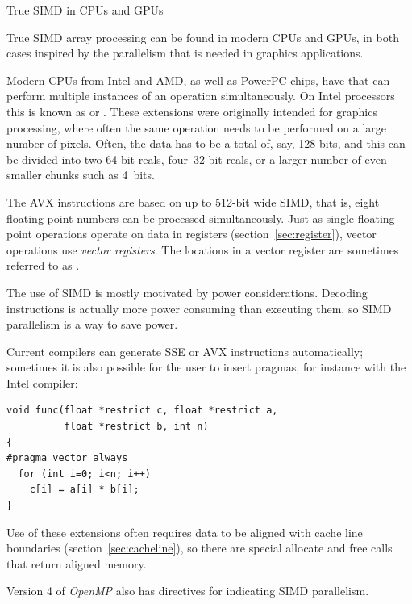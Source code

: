  {True SIMD in CPUs and GPUs}
\label{sec:sse-avx}

True SIMD array processing can be found in modern CPUs and GPUs, in
both cases inspired by the parallelism that is needed in graphics
applications.

Modern CPUs from Intel and AMD, as well as
PowerPC chips, have  that can perform
multiple instances of an operation simultaneously. On Intel processors
this is known as  or . These extensions were
originally intended for graphics processing, where often the same
operation needs to be performed on a large number of pixels. Often,
the data has to be a total of, say, 128 bits, and this can be divided
into two 64-bit reals, four~32-bit reals, or a larger number of even
smaller chunks such as 4~bits. 

The \ac{AVX} instructions are based on up to
512-bit wide SIMD, that is, eight floating point numbers can be
processed simultaneously. Just as single floating point operations
operate on data in registers (section~\ref{sec:register}),
vector operations use \emph{vector registers}.
The locations in a vector register are sometimes referred to as .

The use of SIMD is mostly
motivated by power considerations. Decoding instructions is actually
more power consuming than executing them, so SIMD parallelism is a way
to save power.

Current compilers can generate \ac{SSE} or \ac{AVX}
instructions automatically;
sometimes it is also possible for the user to insert pragmas, for
instance with the Intel compiler:
\begin{verbatim}
void func(float *restrict c, float *restrict a,
          float *restrict b, int n)
{
#pragma vector always
  for (int i=0; i<n; i++)
    c[i] = a[i] * b[i];
}
\end{verbatim}
Use of these extensions often requires data to be aligned with cache
line boundaries (section~\ref{sec:cacheline}), so there are special
allocate and free calls that return aligned memory.

Version 4 of \emph{OpenMP} also has directives for indicating SIMD parallelism.


